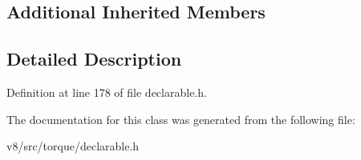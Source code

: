\subsection*{Additional Inherited Members}


\subsection{Detailed Description}


Definition at line 178 of file declarable.\+h.



The documentation for this class was generated from the following file\+:\begin{DoxyCompactItemize}
\item 
v8/src/torque/declarable.\+h\end{DoxyCompactItemize}
